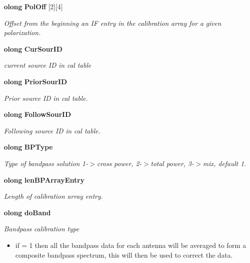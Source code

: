 \begin{CompactItemize}
{\bf olong} {\bf Pol\-Off} [2][4]
\begin{CompactList}\small\item\em Offset from the beginning an IF entry in the calibration array for a given polarization. \item\end{CompactList}\item 
{\bf olong} {\bf Cur\-Sour\-ID}
\begin{CompactList}\small\item\em current source ID in cal table \item\end{CompactList}\item 
{\bf olong} {\bf Prior\-Sour\-ID}
\begin{CompactList}\small\item\em Prior source ID in cal table. \item\end{CompactList}\item 
{\bf olong} {\bf Follow\-Sour\-ID}
\begin{CompactList}\small\item\em Following source ID in cal table. \item\end{CompactList}\item 
{\bf olong} {\bf BPType}
\begin{CompactList}\small\item\em Type of bandpass solution 1-$>$cross power, 2-$>$total power, 3-$>$mix, default 1. \item\end{CompactList}\item 
{\bf olong} {\bf len\-BPArray\-Entry}
\begin{CompactList}\small\item\em Length of calibration array entry. \item\end{CompactList}\item 
{\bf olong} {\bf do\-Band}
\begin{CompactList}\small\item\em Bandpass calibration type \begin{itemize}
\item if = 1 then all the bandpass data for each antenna will be averaged to form a composite bandpass spectrum, this will then be used to correct the data. \end{itemize}
\item\end{CompactList}\item 

\end{CompactItemize}
